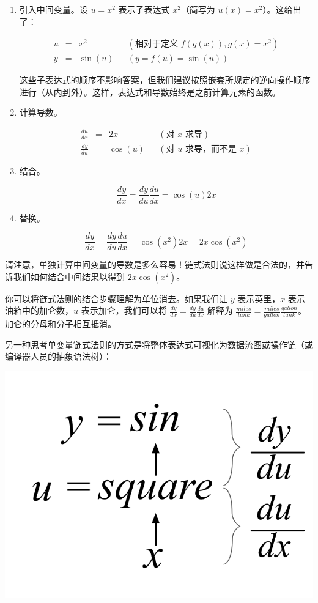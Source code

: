 \documentclass[11pt]{article}
\begin{document}
\begin{enumerate}
\item 引入中间变量。设 $u = x^2$ 表示子表达式 $x^2$（简写为 $u(x) = x^2$）。这给出了：

\[
\begin{array}{lllll}
  u &=& x^2 &&(\text{相对于定义 }f(g(x)), g(x) = x^2)\\
  y &=& \sin(u) && (y = f(u) = \sin(u))
\end{array}
\]

这些子表达式的顺序不影响答案，但我们建议按照嵌套所规定的逆向操作顺序进行（从内到外）。这样，表达式和导数始终是之前计算元素的函数。
\item 计算导数。

\[
\begin{array}{lllll}
 \frac{du}{dx} &=& 2x && (\text{对 }x \text{ 求导})\\
 \frac{dy}{du} &=& \cos(u) && (\text{对 }u \text{ 求导，而不是 }x)
\end{array}
\]

\item 结合。

\[
\frac{dy}{dx} = \frac{dy}{du} \frac{du}{dx} = \cos(u)2x
\]

\item 替换。

\[
\frac{dy}{dx} = \frac{dy}{du} \frac{du}{dx} = \cos(x^2)2x = 2x\cos(x^2)
\]
\end{enumerate}

请注意，单独计算中间变量的导数是多么容易！链式法则说这样做是合法的，并告诉我们如何结合中间结果以得到 $2x\cos(x^2)$。

你可以将链式法则的结合步骤理解为单位消去。如果我们让 $y$ 表示英里，$x$ 表示油箱中的加仑数，$u$ 表示加仑，我们可以将 $\frac{dy}{dx} = \frac{dy}{du} \frac{du}{dx}$ 解释为 $\frac{miles}{tank} = \frac{miles}{gallon} \frac{gallon}{tank}$。加仑的分母和分子相互抵消。

另一种思考单变量链式法则的方式是将整体表达式可视化为数据流图或操作链（或编译器人员的抽象语法树）：

\begin{center}
\includegraphics{sin-square.png}
\end{center}
\end{document}
